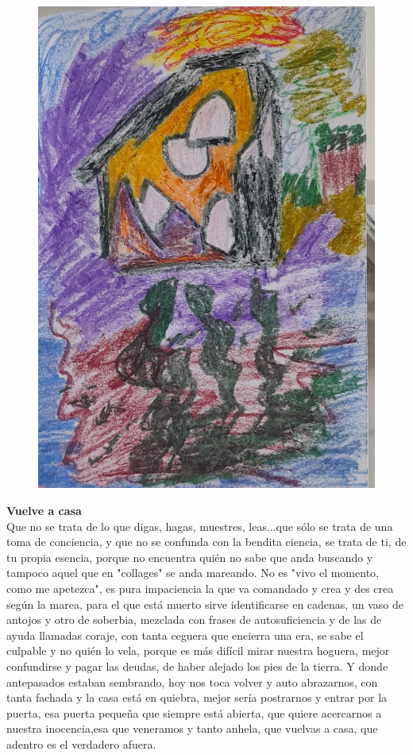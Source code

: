 \documentclass[12pt, a4paper, twoside]{book} %
\begin{document}
\begin{figure}[H]
	\centering
	\includegraphics[width=\textwidth]{./images/1f81324df38bf5.jpg}
\end{figure}

\clearpage

\noindent\textbf{Vuelve a casa}\\
Que no se trata de lo que digas, hagas, muestres, leas...que sólo se trata de una toma de conciencia, y que no se confunda con la bendita ciencia, se trata de ti, de tu propia esencia, porque no encuentra quién no sabe que anda buscando y tampoco aquel que en "collages" se anda mareando. No es "vivo el momento, como me apetezca", es pura impaciencia la que va comandado y crea y des crea según la marea, para el que está muerto sirve identificarse en cadenas, un vaso de antojos y otro de soberbia, mezclada con frases de autosuficiencia y de las de ayuda llamadas coraje, con tanta ceguera que encierra una era, se sabe el culpable y no quién lo vela, porque es más difícil mirar nuestra hoguera, mejor confundirse y pagar las deudas, de haber alejado los pies de la tierra. Y  donde antepasados estaban sembrando, hoy nos toca volver y auto abrazarnos, con tanta fachada y la casa está en quiebra, mejor sería  postrarnos y entrar por la puerta, esa puerta pequeña que siempre está abierta, que quiere acercarnos a nuestra inocencia,esa que veneramos y tanto anhela, que vuelvas a casa, que adentro es el verdadero afuera.
\end{document}

